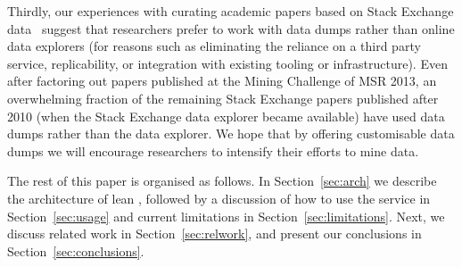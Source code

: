 Thirdly, our experiences with curating academic papers based on Stack Exchange data~\cite{vasilescu2012meta}
suggest that researchers prefer to work with data dumps rather than online data explorers
(for reasons such as eliminating the reliance on a third party service, replicability, or integration with existing
tooling or infrastructure).
Even after factoring out papers published at the Mining Challenge of MSR 2013, an overwhelming
fraction of the remaining Stack Exchange papers published after 2010 (when the Stack Exchange data explorer
became available) have used data dumps rather than the data explorer.
We hope that by offering customisable \ght data dumps we will encourage researchers to intensify their efforts
to mine \gh data.

The rest of this paper is organised as follows.
In Section~\ref{sec:arch} we describe the architecture of lean \ght, followed by a discussion of how to use the
service in Section~\ref{sec:usage} and current limitations in Section~\ref{sec:limitations}.
Next, we discuss related work in Section~\ref{sec:relwork}, and present our conclusions in Section~\ref{sec:conclusions}.

